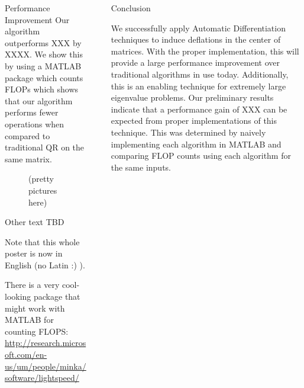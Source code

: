 \documentclass[final]{beamer}
\newlength{\sepwid}
\newlength{\onecolwid}
\newlength{\twocolwid}
\begin{document}
\begin{frame}[t]
\begin{columns}[t]
\begin{column}{\twocolwid}
\begin{alertblock}{Performance Improvement}
Our algorithm outperforms XXX by XXXX. We show this by using a MATLAB package
which counts FLOPs which shows that our algorithm performs fewer operations when
compared to traditional QR on the same matrix.

\begin{figure}[h]
(pretty pictures here)
\end{figure}

Other text TBD

Note that this whole poster is now in English (no Latin :) ).

There is a very cool-looking package that might work with MATLAB for counting
FLOPS:
\url{http://research.microsoft.com/en-us/um/people/minka/software/lightspeed/}

\end{alertblock}

\end{column} %

\begin{column}{\sepwid}\end{column} %

\begin{column}{\onecolwid} %


\begin{block}{Conclusion}

We successfully apply Automatic Differentiation techniques to induce deflations
in the center of matrices. With the proper implementation, this will provide a
large performance improvement over traditional algorithms in use today.
Additionally, this is an enabling technique for extremely large eigenvalue
problems. Our preliminary results indicate that a performance gain of XXX can be
expected from proper implementations of this technique. This was determined by
naively implementing each algorithm in MATLAB and comparing FLOP counts using
each algorithm for the same inputs.

\end{block}



\end{column}
\end{columns}
\end{frame}
\end{document}
